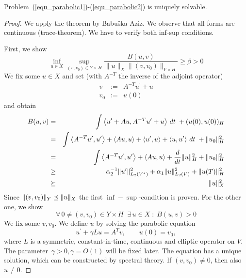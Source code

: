 \begin{theorem}[Lions] \label{theo_continuous} Problem~(\ref{equ_parabolic1})-(\ref{equ_parabolic2}) is uniquely solvable.
\end{theorem}
\begin{proof}
We apply the theorem by Babu\v{s}ka-Aziz. We observe that all forms are continuous (trace-theorem). 
We have to verify both inf-sup conditions.

First, we show
\begin{equation}
\inf_{u \in X} \sup_{ (v,v_0) \in Y \times H} \frac{B(u,v)} {\| u \|_X  \| (v,v_0) \|_{Y \times H}}  \geq \beta > 0
\end{equation}
We fix some $u \in X$ and set (with $A^{-T}$ the inverse of the adjoint operator)
\begin{eqnarray*}
v &  := & A^{-T} u^\prime + u \\
v_0 & := & u(0)
\end{eqnarray*}
and obtain
\begin{eqnarray*}
B(u,v) & = & \int \left< u^\prime + A u, A^{-T} u^\prime + u \right> \, dt \; + (u(0), u(0))_H \\
& = & \int \left<A^{-T} u^\prime, u^\prime \right> + \left< A u, u \right> + \left< u^\prime, u \right> + \left< u, u^\prime \right> \, dt \;  + \| u_0 \|_H^2 \\
& = & \int \left<A^{-T} u^\prime, u^\prime \right> + \left< A u, u \right> + \frac{d}{dt} \| u \|_H^2  + \| u_0 \|_H^2 \\
& \geq & \alpha_2^{-1}  \| u^\prime \|^2_{L_2(V^\ast)} + \alpha_1 \| u \|^2_{L_2(V)} + \| u(T) \|_H^2 \\
& \succeq &  \| u \|_X^2
\end{eqnarray*}
Since $\| (v,v_0) \|_Y \preceq \| u \|_X$ the first $\inf-\sup$-condition is proven.
For the other one, we show
\begin{equation}
\forall \, 0 \neq (v,v_0) \in Y \times H \; \; \exists \, u \in X  \;  : \;  B(u,v) > 0
\end{equation}
We fix some $v, v_0$. We define $u$ by solving the parabolic equation
$$
u^\prime + \gamma L u = A^T v, \qquad u(0) = v_0,
$$
where $L$ is a symmetric, constant-in-time, continuous and elliptic operator on $V$. 
The parameter~$\gamma > 0, \gamma = O(1)$ will be fixed later. The equation has a unique solution, which can be constructed by spectral theory.
If $(v,v_0) \neq 0$, then also $u \neq 0$.


\end{proof}

